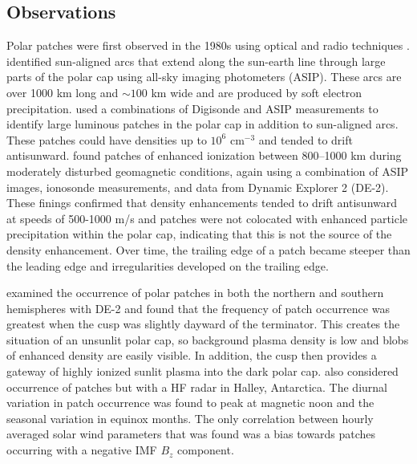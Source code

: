 \subsection{Observations}

Polar patches were first observed in the 1980s using optical and radio techniques \citep{Weber1981,Buchau1983,Weber1984}.  \citet{Weber1981} identified sun-aligned arcs that extend  along the sun-earth line through large parts of the polar cap using all-sky imaging photometers (ASIP).  These arcs are over 1000 km long and \(\sim100\) km wide and are produced by soft electron precipitation.  \citet{Buchau1983} used a combinations of Digisonde and ASIP measurements to identify large luminous patches in the polar cap in addition to sun-aligned arcs.  These patches could have densities up to \(10^6\) cm\(^{-3}\) and tended to drift antisunward.  \citet{Weber1984} found patches of enhanced ionization between 800--1000 km during moderately disturbed geomagnetic conditions, again using a combination of ASIP images, ionosonde measurements, and data from Dynamic Explorer 2 (DE-2).  These finings confirmed that density enhancements tended to drift antisunward at speeds of 500-1000 m/s and patches were not colocated with enhanced particle precipitation within the polar cap, indicating that this is not the source of the density enhancement.  Over time, the trailing edge of a patch became steeper than the leading edge and irregularities developed on the trailing edge.

\citet{Coley1998} examined the occurrence of polar patches in both the northern and southern hemispheres with DE-2 and found that the frequency of patch occurrence was greatest when  the cusp was slightly dayward of the terminator.  This creates the situation of an unsunlit polar cap, so background plasma density is low and blobs of enhanced density are easily visible.  In addition, the cusp then provides a gateway of highly ionized sunlit plasma into the dark polar cap.  \citet{Rodger1996} also considered occurrence of patches but with a HF radar in Halley, Antarctica.  The diurnal variation in patch occurrence was found to peak at magnetic noon and the seasonal variation in equinox months.  The only correlation between hourly averaged solar wind parameters that was found was a bias towards patches occurring with a negative IMF \(B_z\) component.

